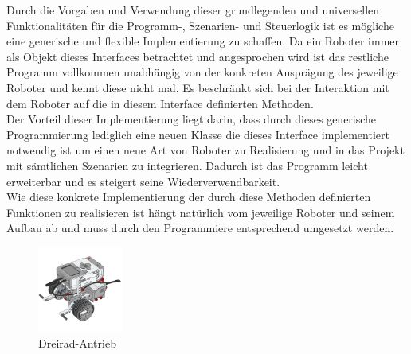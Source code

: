 Durch die Vorgaben und Verwendung dieser grundlegenden und universellen Funktionalitäten für die Programm-, Szenarien- und Steuerlogik 
ist es mögliche eine generische und flexible Implementierung zu schaffen. Da ein Roboter immer als Objekt dieses Interfaces betrachtet 
und angesprochen wird ist das restliche Programm vollkommen unabhängig von der konkreten Ausprägung des jeweilige Roboter und kennt 
diese nicht mal. Es beschränkt sich bei der Interaktion mit dem Roboter auf die in diesem Interface definierten Methoden. \\
Der Vorteil dieser Implementierung liegt darin, dass durch dieses generische Programmierung lediglich eine neuen Klasse die dieses 
Interface implementiert notwendig ist um einen neue Art von Roboter zu Realisierung und in das Projekt mit sämtlichen Szenarien zu 
integrieren. Dadurch ist das Programm leicht erweiterbar und es steigert seine Wiederverwendbarkeit. \\
Wie diese konkrete Implementierung der durch diese Methoden definierten Funktionen zu realisieren ist hängt natürlich vom jeweilige
Roboter und seinem Aufbau ab und muss durch den Programmiere entsprechend umgesetzt werden.
\pagebreak
\begin{figure}
	\vspace{+0.0cm}
	\begin{center}
		\includegraphics[width=0.25\textwidth]{images/implementation/threewheeldrive.png}
	\end{center}
	\caption{Dreirad-Antrieb}
	\label{fig:einachsenlenkung}
\end{figure}
